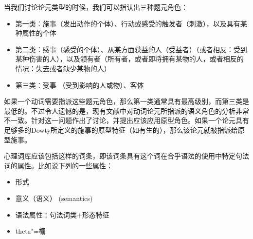 当我们讨论论元类型的时候，我们可以指认出三种题元角色：
\begin{itemize}
\item 第一类：施事（发出动作的个体）、行动或感受的触发者（刺激），以及具有某种属性的个体
\item 第二类：感事（感受的个体）、从某方面获益的人（受益者）（或者相反：受到某种伤害的人），以及领有者（所有者，或者即将拥有某物的人，或者相反的情况：失去或者缺少某物的人）
\item 第三类：受事 （受到影响的人或物）、客体
\end{itemize}
如果一个动词需要指派这些题元角色，那么第一类通常具有最高级别，而第三类是最低的。不过令人遗憾的是，现有文献中对动词论元所指派的语义角色的分析非常不一致。\citet{Dowty91a}针对这一问题作出了讨论，并提出应该应用原型角色。如果一个论元具有足够多的Dowty所定义的施事的原型特征（如有生的），那么该论元就被指派给原型施事。
\nocite{Gruber65a-u,Fillmore68,Fillmore71a-u,Jackendoff72a-u,Dowty91a}

心理词库应该包括这样的词条，即该词条具有这个词在合乎语法的使用中特定句法词的属性。比如说下列的一些属性：
\begin{itemize}
\item 形式
\item 意义（语义） (semantics)
\item 语法属性：句法词类$+$形态特征  
\item theta"=栅
\end{itemize}

